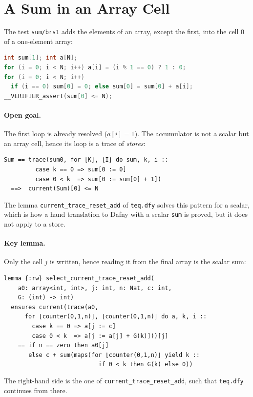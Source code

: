 \documentclass[sigconf,nonacm]{acmart}
\newcommand{\code}[1]{\texttt{#1}}
\begin{document}
\section{A Sum in an Array Cell}

The test \code{sum/brs1} adds the elements of an array, except the first,
into the cell 0 of a one-element array:
\begin{lstlisting}[language=C]
int sum[1]; int a[N];
for (i = 0; i < N; i++) a[i] = (i % 1 == 0) ? 1 : 0;
for (i = 0; i < N; i++)
  if (i == 0) sum[0] = 0; else sum[0] = sum[0] + a[i];
__VERIFIER_assert(sum[0] <= N);
\end{lstlisting}

\paragraph{Open goal.} The first loop is already resolved ($a[i] = 1$). The
accumulator is not a scalar but an array cell, hence its loop is a trace of
\emph{stores}:
\begin{lstlisting}[language=goal]
Sum == trace(sum0, for ⌊K⌋, ⌊I⌋ do sum, k, i ::
         case k == 0 => sum[0 := 0]
         case 0 < k  => sum[0 := sum[0] + 1])
  ==>  current(Sum)[0] <= N
\end{lstlisting}
The lemma \code{current\_trace\_reset\_add} of \code{teq.dfy} solves this
pattern for a scalar, which is how a hand translation to Dafny with a scalar
\code{sum} is proved, but it does not apply to a store.

\paragraph{Key lemma.} Only the cell $j$ is written, hence reading it from
the final array is the scalar sum:
\begin{lstlisting}[language=dafny]
lemma {:rw} select_current_trace_reset_add(
    a0: array<int, int>, j: int, n: Nat, c: int,
    G: (int) -> int)
  ensures current(trace(a0,
      for ⌊counter(0,1,n)⌋, ⌊counter(0,1,n)⌋ do a, k, i ::
        case k == 0 => a[j := c]
        case 0 < k  => a[j := a[j] + G(k)]))[j]
    == if n == zero then a0[j]
       else c + sum(maps(for ⌊counter(0,1,n)⌋ yield k ::
                           if 0 < k then G(k) else 0))
\end{lstlisting}
The right-hand side is the one of \code{current\_trace\_reset\_add}, such that
\code{teq.dfy} continues from there.
\end{document}
